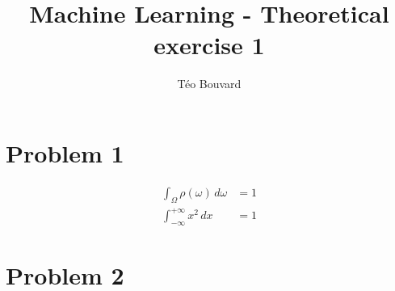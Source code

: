 \documentclass[a4paper, 12pt, twoside]{report}
\begin{document}
\title{Machine Learning - Theoretical exercise 1}
\author{T\'eo Bouvard}
\maketitle

\section{Problem 1}

\begin{align*}
    \int_\Omega \rho(\omega) \,d\omega &= 1 \\
    \int_{-\infty}^{+\infty} x^2 \,dx &= 1
\end{align*}


\section{Problem 2}
\end{document}
